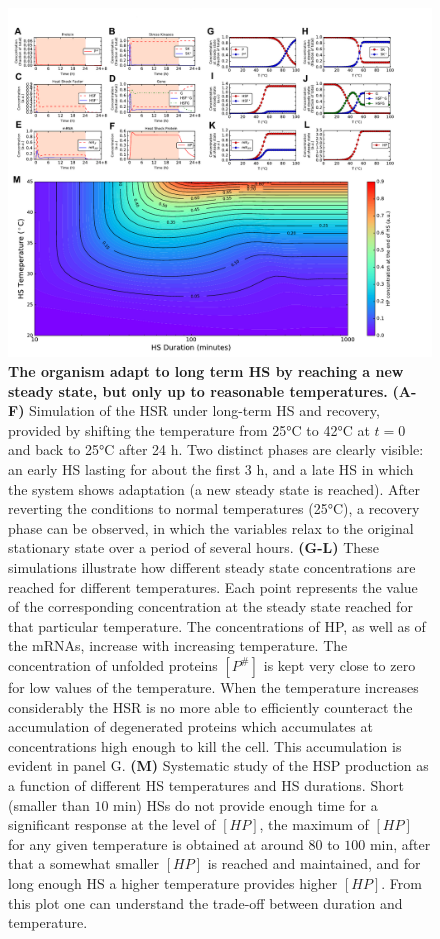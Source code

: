 \documentclass[oneside, 10pt, a4paper, twocolumn]{article}
\begin{document}
\begin{figure}
\centering
\includegraphics[width=\textwidth]{Figure8_SupMat.pdf}
\caption{\small{\textbf{The organism adapt to long term HS by reaching a new steady state, but only up to reasonable temperatures.} \textbf{(A-F)} Simulation of the HSR under long-term HS and recovery, provided by shifting the temperature from 25°C to 42°C at $t=0$ and back to 25°C after 24 h. Two distinct phases are clearly visible: an early HS lasting for about the first $3$ h, and a late HS in which the system shows adaptation (a new steady state is reached). 
After reverting the conditions to normal temperatures (25°C), a recovery phase can be observed, in which
the variables relax to the original stationary state over a period of several hours. \textbf{(G-L)} These simulations illustrate how different steady state concentrations are reached for different temperatures. Each point represents the value of the corresponding concentration at the steady state reached for that particular temperature. The concentrations of HP, as well as of the mRNAs, increase with increasing temperature. The concentration of unfolded proteins $\left[P^\#\right]$ is kept very close to zero for low values of the temperature. When the temperature increases considerably the HSR is no more able to efficiently counteract the accumulation of degenerated proteins which accumulates at concentrations high enough to kill the cell. This accumulation is evident in panel G. 
\textbf{(M)} Systematic study of the HSP production as a function of different HS temperatures and HS durations. Short (smaller than $10$ min) HSs do not provide enough time for a significant response at the level of $\left[HP\right]$, the maximum of $\left[HP\right]$ for any given temperature is obtained at around $80$ to $100$ min, after that a somewhat smaller $\left[HP\right]$ is reached and maintained, and for long enough HS a higher temperature provides higher $\left[HP\right]$. From this plot one can understand the trade-off between duration and temperature.}
}
\label{Figure8label}
\end{figure}
\end{document}
